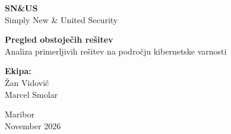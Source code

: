 \documentclass[a4paper,12pt]{article}
\begin{document}
\begin{titlepage}
    \centering
    
    \vfill
    
    {\large }


    {\Huge \textbf{SN\&US}}\\[0.3cm]
    {\large Simply New \& United Security}

    \vspace{2cm}

    {\LARGE \textbf{Pregled obstoječih rešitev}}\\[0.5cm]

    {\large Analiza primerljivih rešitev
    na področju kibernetske varnosti}

    \vfill

    \textbf{Ekipa:}\\
    Žan Vidovič\\
    Marcel Smolar

    \vfill

    Maribor \\ November 2026

\end{titlepage}
\end{document}
